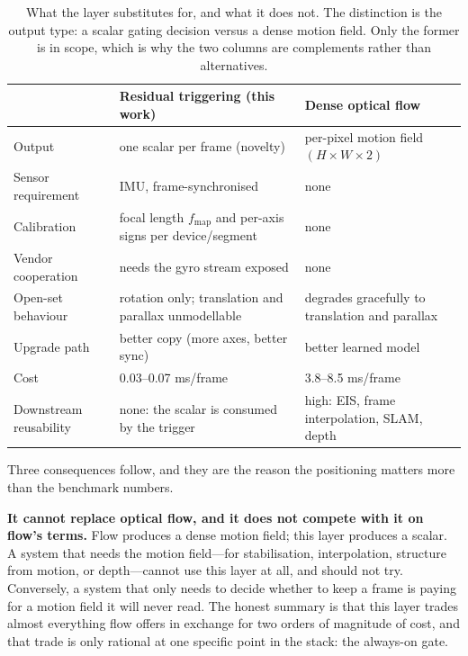\documentclass[12pt,a4paper]{article}
\begin{document}
\begin{table}[htbp]
  \centering
  \small
  \caption{What the layer substitutes for, and what it does not. The distinction is the output type: a scalar gating decision versus a dense motion field. Only the former is in scope, which is why the two columns are complements rather than alternatives.}
  \label{tab:scope}
  \begin{tabular}{L{2.6cm}L{5.4cm}L{5.4cm}}
    \toprule
    & Residual triggering (this work) & Dense optical flow \\
    \midrule
    Output & one scalar per frame (novelty) & per-pixel motion field $(H{\times}W{\times}2)$ \\
    Sensor requirement & IMU, frame-synchronised & none \\
    Calibration & focal length $f_{\mathrm{map}}$ and per-axis signs per device/segment & none \\
    Vendor cooperation & needs the gyro stream exposed & none \\
    Open-set behaviour & rotation only; translation and parallax unmodellable & degrades gracefully to translation and parallax \\
    Upgrade path & better copy (more axes, better sync) & better learned model \\
    Cost & 0.03--0.07 ms/frame & 3.8--8.5 ms/frame \\
    Downstream reusability & none: the scalar is consumed by the trigger & high: EIS, frame interpolation, SLAM, depth \\
    \bottomrule
  \end{tabular}
\end{table}

Three consequences follow, and they are the reason the positioning matters more than the benchmark numbers.

\textbf{It cannot replace optical flow, and it does not compete with it on flow's terms.} Flow produces a dense motion field; this layer produces a scalar. A system that needs the motion field---for stabilisation, interpolation, structure from motion, or depth---cannot use this layer at all, and should not try. Conversely, a system that only needs to decide whether to keep a frame is paying for a motion field it will never read. The honest summary is that this layer trades almost everything flow offers in exchange for two orders of magnitude of cost, and that trade is only rational at one specific point in the stack: the always-on gate.
\end{document}
